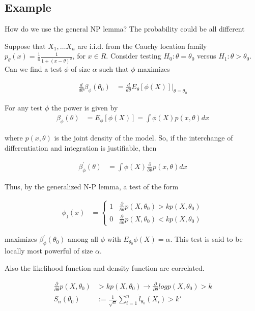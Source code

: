 \subsection{Example}
How do we use the general NP lemma? The probability could be all different

Suppose that $X_1, … X_n$ are i.i.d. from the Cauchy location family $p_{\theta}(x) = \frac{1}{\pi} \frac{1}{1+ (x-\theta)^2}$, for $x \in R$. Consider testing $H_0: \theta = \theta_0$ versus $H_1: \theta > \theta_0$. Can we find a test $\phi$ of size $\alpha$ such that $\phi$ maximizes

\begin{align*}
	\frac{d}{d \theta} \beta_{\phi} (\theta_0)  &= \frac{d}{d \theta} E_{\theta}[\phi(X)] \Big |_{\theta = \theta_0}
\end{align*}

For any test $\phi$ the power is given by
\begin{align*}
	\beta_{\phi}(\theta) &= E_{\phi}[\phi(X)] = \int \phi(X) p(x, \theta) dx
\end{align*}

where $p(x, \theta)$ is the joint density of the model. So, if the interchange of differentiation and integration is justifiable, then 

\begin{align*}
	\beta_{\phi}^{'}(\theta) &=  \int \phi(X) \frac{\partial}{\partial \theta}p(x, \theta) dx
\end{align*}

Thus, by the generalized N-P lemma, a test of the form

\begin{align*}
	\phi_)(x) &= \begin{cases}
	1 & \frac{\partial}{\partial \theta} p(X, \theta_0) > k p(X, \theta_0) \\
	0 &  \frac{\partial}{\partial \theta} p(X, \theta_0) < k p(X, \theta_0) 
	\end{cases}
\end{align*}

maximizes $\beta^{'}_{\phi}(\theta_0)$ among all $\phi$ with $E_{\theta_0} \phi(X) = \alpha$. This test is said to be locally most powerful of size $\alpha$. 

Also the likelihood function and density function are correlated.

\begin{align*}
	\frac{\partial}{\partial \theta} p(X, \theta_0) & > k p(X, \theta_0) \rightarrow \frac{\partial}{\partial \theta} log p(X, \theta_0) > k\\
	S_n(\theta_0) &:= \frac{1}{\sqrt{n}} \sum_{i=1}^n \dot{l}_{\theta_0} (X_i) > k'
\end{align*}

